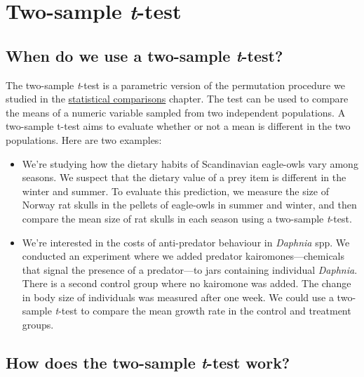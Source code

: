 \documentclass[
]{book}
\begin{document}
\hypertarget{two-sample-t-test}{%
\chapter{\texorpdfstring{Two-sample \emph{t}-test}{Two-sample t-test}}\label{two-sample-t-test}}

\hypertarget{when-do-we-use-a-two-sample-t-test}{%
\section{\texorpdfstring{When do we use a two-sample \emph{t}-test?}{When do we use a two-sample t-test?}}\label{when-do-we-use-a-two-sample-t-test}}

The two-sample \emph{t}-test is a parametric version of the permutation procedure we studied in the \protect\hyperlink{statistical-comparisons}{statistical comparisons} chapter. The test can be used to compare the means of a numeric variable sampled from two independent populations. A two-sample t-test aims to evaluate whether or not a mean is different in the two populations. Here are two examples:

\begin{itemize}
\item
  We're studying how the dietary habits of Scandinavian eagle-owls vary among seasons. We suspect that the dietary value of a prey item is different in the winter and summer. To evaluate this prediction, we measure the size of Norway rat skulls in the pellets of eagle-owls in summer and winter, and then compare the mean size of rat skulls in each season using a two-sample \emph{t}-test.
\item
  We're interested in the costs of anti-predator behaviour in \emph{Daphnia} spp. We conducted an experiment where we added predator kairomones---chemicals that signal the presence of a predator---to jars containing individual \emph{Daphnia}. There is a second control group where no kairomone was added. The change in body size of individuals was measured after one week. We could use a two-sample \emph{t}-test to compare the mean growth rate in the control and treatment groups.
\end{itemize}

\hypertarget{how-does-the-two-sample-t-test-work}{%
\section{\texorpdfstring{How does the two-sample \emph{t}-test work?}{How does the two-sample t-test work?}}\label{how-does-the-two-sample-t-test-work}}
\end{document}
